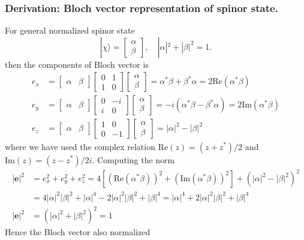 \documentclass[../../../main.tex]{subfiles}
\begin{document}
\subsubsection{Derivation: Bloch vector representation of spinor state.}
For general normalized spinor state
\begin{equation*}
    |\chi\rangle = \begin{bmatrix} \alpha \\ \beta \end{bmatrix}, \quad |\alpha|^2 + |\beta|^2 = 1.
\end{equation*}
then the components of Bloch vector is
\begin{align*}
    e_x & =  \begin{bmatrix} \alpha & \beta \end{bmatrix}\begin{bmatrix} 0 & 1 \\ 1 & 0 \end{bmatrix} \begin{bmatrix} \alpha \\ \beta \end{bmatrix} = \alpha^*\beta + \beta^*\alpha = 2\text{Re}(\alpha^*\beta)      \\
    e_y & =  \begin{bmatrix} \alpha & \beta \end{bmatrix}\begin{bmatrix} 0 & -i \\ i & 0 \end{bmatrix} \begin{bmatrix} \alpha \\ \beta \end{bmatrix} = -i(\alpha^*\beta - \beta^*\alpha) = 2\text{Im}(\alpha^*\beta) \\
    e_z & =  \begin{bmatrix} \alpha & \beta \end{bmatrix} \begin{bmatrix} 1 & 0 \\ 0 & -1 \end{bmatrix}  \begin{bmatrix} \alpha \\ \beta \end{bmatrix} = |\alpha|^2 - |\beta|^2
\end{align*}
where we have used the complex relation $\mathrm{Re } (z) = (z + z ^* )/2$ and $\mathrm{Im } (z) = (z - z ^* )/2i$.
Computing the norm
\begin{align*}
    |\mathbf{e}|^2 & =  e_x^2 + e_y^2 + e_z^2 = 4\left[(\mathrm{Re}(\alpha^* \beta))^2 + (\mathrm{Im}(\alpha^* \beta))^2\right] + (|\alpha|^2 - |\beta|^2)^2 \\
                   & =  4|\alpha|^2 |\beta|^2 + |\alpha|^4 - 2|\alpha|^2|\beta|^2 + |\beta|^4 = |\alpha|^4 + 2 |\alpha|^2 |\beta|^2 + |\beta|^4              \\
    |\mathbf{e}|^2
                   & = (|\alpha|^2 + |\beta|^2)^2 = 1
\end{align*}
Hence the Bloch vector also normalized
\end{document}
